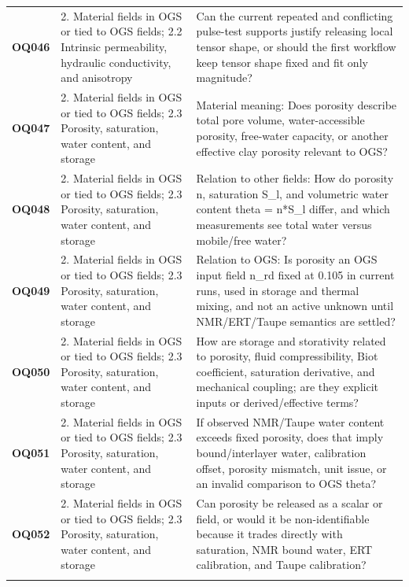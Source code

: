 \begin{longtable}{@{}L{0.10\textwidth} L{0.23\textwidth} L{0.59\textwidth}@{}}
\addlinespace[0.16em]
\textbf{OQ046} & 2. Material fields in OGS or tied to OGS fields; 2.2 Intrinsic permeability, hydraulic conductivity, and anisotropy & Can the current repeated and conflicting pulse-test supports justify releasing local tensor shape, or should the first workflow keep tensor shape fixed and fit only magnitude?\\
\addlinespace[0.16em]
\textbf{OQ047} & 2. Material fields in OGS or tied to OGS fields; 2.3 Porosity, saturation, water content, and storage & Material meaning: Does porosity describe total pore volume, water-accessible porosity, free-water capacity, or another effective clay porosity relevant to OGS?\\
\addlinespace[0.16em]
\textbf{OQ048} & 2. Material fields in OGS or tied to OGS fields; 2.3 Porosity, saturation, water content, and storage & Relation to other fields: How do porosity n, saturation S\_l, and volumetric water content theta = n*S\_l differ, and which measurements see total water versus mobile/free water?\\
\addlinespace[0.16em]
\textbf{OQ049} & 2. Material fields in OGS or tied to OGS fields; 2.3 Porosity, saturation, water content, and storage & Relation to OGS: Is porosity an OGS input field n\_rd fixed at 0.105 in current runs, used in storage and thermal mixing, and not an active unknown until NMR/ERT/Taupe semantics are settled?\\
\addlinespace[0.16em]
\textbf{OQ050} & 2. Material fields in OGS or tied to OGS fields; 2.3 Porosity, saturation, water content, and storage & How are storage and storativity related to porosity, fluid compressibility, Biot coefficient, saturation derivative, and mechanical coupling; are they explicit inputs or derived/effective terms?\\
\addlinespace[0.16em]
\textbf{OQ051} & 2. Material fields in OGS or tied to OGS fields; 2.3 Porosity, saturation, water content, and storage & If observed NMR/Taupe water content exceeds fixed porosity, does that imply bound/interlayer water, calibration offset, porosity mismatch, unit issue, or an invalid comparison to OGS theta?\\
\addlinespace[0.16em]
\textbf{OQ052} & 2. Material fields in OGS or tied to OGS fields; 2.3 Porosity, saturation, water content, and storage & Can porosity be released as a scalar or field, or would it be non-identifiable because it trades directly with saturation, NMR bound water, ERT calibration, and Taupe calibration?\\
\addlinespace[0.16em]

\end{longtable}
